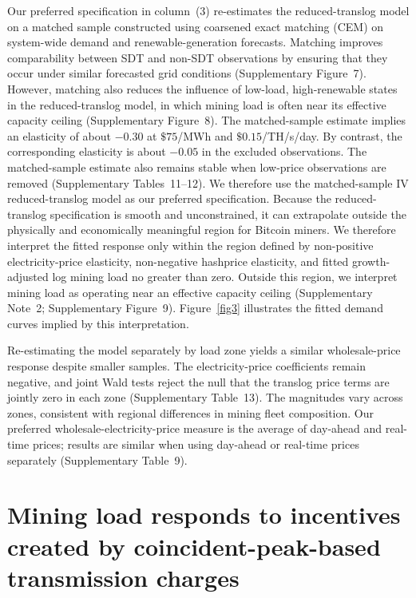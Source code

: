 \documentclass[pdflatex,sn-mathphys-num]{sn-jnl}%
\theoremstyle{thmstyleone}%
\theoremstyle{thmstyletwo}%
\theoremstyle{thmstylethree}%
\begin{document}
Our preferred specification in column~(3) re-estimates the reduced-translog model on a matched sample constructed using coarsened exact matching (CEM) \cite{iacus2012causal} on system-wide demand and renewable-generation forecasts. Matching improves comparability between SDT and non-SDT observations by ensuring that they occur under similar forecasted grid conditions (Supplementary Figure~7). However, matching also reduces the influence of low-load, high-renewable states in the reduced-translog model, in which mining load is often near its effective capacity ceiling (Supplementary Figure~8). The matched-sample estimate implies an elasticity of about $-0.30$ at $\$75$/MWh and $\$0.15$/TH/s/day. By contrast, the corresponding elasticity is about $-0.05$ in the excluded observations. The matched-sample estimate also remains stable when low-price observations are removed (Supplementary Tables~11--12). We therefore use the matched-sample IV reduced-translog model as our preferred specification. Because the reduced-translog specification is smooth and unconstrained, it can extrapolate outside the physically and economically meaningful region for Bitcoin miners. We therefore interpret the fitted response only within the region defined by non-positive electricity-price elasticity, non-negative hashprice elasticity, and fitted growth-adjusted log mining load no greater than zero. Outside this region, we interpret mining load as operating near an effective capacity ceiling (Supplementary Note~2; Supplementary Figure~9). Figure~\ref{fig3} illustrates the fitted demand curves implied by this interpretation.

Re-estimating the model separately by load zone yields a similar wholesale-price response despite smaller samples. The electricity-price coefficients remain negative, and joint Wald tests reject the null that the translog price terms are jointly zero in each zone (Supplementary Table~13). The magnitudes vary across zones, consistent with regional differences in mining fleet composition. Our preferred wholesale-electricity-price measure is the average of day-ahead and real-time prices; results are similar when using day-ahead or real-time prices separately (Supplementary Table~9).

\section{Mining load responds to incentives created by coincident-peak-based transmission charges}\label{sec3}
\end{document}
